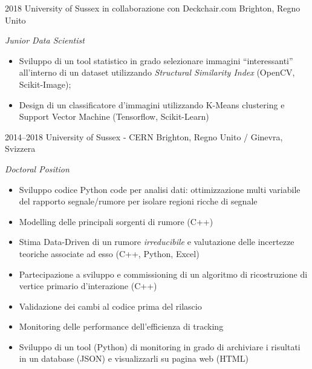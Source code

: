 \documentclass[print]{cv} %
\begin{document}
  \begin{entrylist}
    \entry
    {2018}
    {University of Sussex in collaborazione con Deckchair.com}
    {Brighton, Regno Unito}
    {\emph{Junior Data Scientist}
    \begin{itemize}
      \item Sviluppo di un tool statistico in grado selezionare immagini ``interessanti'' all'interno di un dataset utilizzando \emph{Structural Similarity Index} (OpenCV, Scikit-Image);
      \item  Design di un classificatore d'immagini utilizzando K-Means clustering e Support Vector Machine (Tensorflow, Scikit-Learn)
    \end{itemize}
    }
  \end{entrylist}

  \begin{entrylist}
    \entry
    {2014--2018}
    {University of Sussex - CERN}
    {Brighton, Regno Unito / Ginevra, Svizzera}
    {\emph{Doctoral Position}
    \begin{itemize}
      \item Sviluppo codice Python code per analisi dati: ottimizzazione multi variabile del rapporto segnale/rumore per isolare regioni ricche di segnale
      \item Modelling delle principali sorgenti di rumore (C++)
      \item Stima Data-Driven di un rumore \emph{irreducibile} e valutazione delle incertezze teoriche associate ad esso (C++, Python, Excel)
      \item Partecipazione a sviluppo e commissioning di un algoritmo di ricostruzione di vertice primario d'interazione (C++)
      \item Validazione dei cambi al codice prima del rilascio
      \item Monitoring delle performance dell'efficienza di tracking
      \item Sviluppo di un tool (Python) di monitoring in grado di archiviare i risultati in un database (JSON) e visualizzarli su pagina web (HTML)
    \end{itemize}      
    }
  \end{entrylist}
\end{document}
